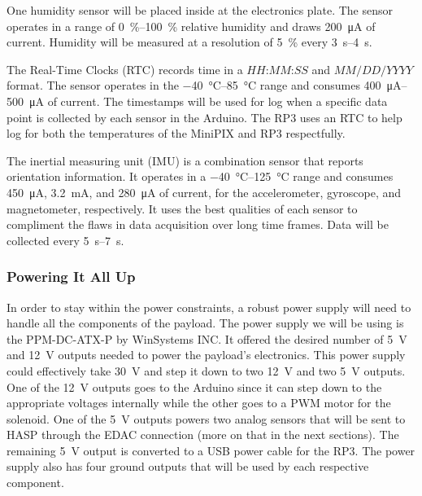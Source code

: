 One humidity sensor will be placed inside at the electronics plate.  The sensor operates in a range of \SIrange{0}{100}{\percent} relative humidity and draws \SI{200}{\micro\ampere} of current.  Humidity will be measured at a resolution of \SI{5}{\percent} every \SIrange{3}{4}{\second}.

The Real-Time Clocks (RTC) records time in a $HH$:$MM$:$SS$ and $MM/DD/YYYY$ format.  The sensor operates in the \SIrange{-40}{85}{\celsius} range and consumes \SIrange{400}{500}{\micro\ampere} of current.  The timestamps  will be used for log when a specific data point is collected by each sensor in the Arduino.  The RP3  uses an RTC to help log for both the temperatures of the MiniPIX and RP3 respectfully.

The inertial measuring unit (IMU) is a combination sensor that reports orientation information.  It operates in a \SIrange{-40}{125}{\celsius} range and consumes \SI{450}{\micro\ampere}, \SI{3.2}{\milli\ampere}, and \SI{280}{\micro\ampere} of current, for the accelerometer, gyroscope, and magnetometer, respectively.  It uses the best qualities of each sensor to compliment the flaws in data acquisition over long time frames.  Data will be collected every \SIrange{5}{7}{\second}.
 


\subsubsection{Powering It All Up}

In order to stay within the power constraints, a robust power supply will need to  handle all the components of the payload.  The power supply we will be using is the PPM-DC-ATX-P by WinSystems INC.  It offered the desired number of \SI{+5}{\volt} and \SI{+12}{\volt} outputs needed to power the payload's electronics.  This power supply could effectively take \SI{+30}{\volt} and step it down to two \SI{+12}{\volt} and two \SI{+5 }{\volt} outputs.  One of the \SI{+12}{\volt} outputs goes to the Arduino since it can step down to the appropriate voltages internally while the other goes to a PWM motor for the solenoid.  One of the \SI{+5 }{\volt} outputs powers two analog sensors that will be sent to HASP through the EDAC connection (more on that in the next sections).  The remaining \SI{+5 }{\volt} output is converted to a USB power cable for the RP3.  The power supply also has four ground outputs that will be used by each respective component. 

